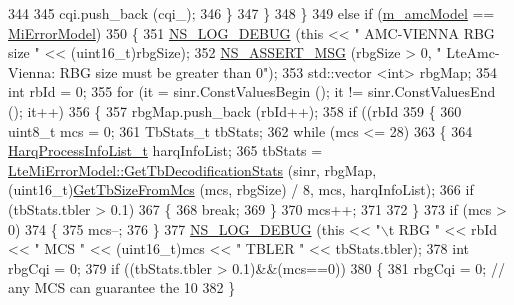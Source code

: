 \begin{DoxyCode}
344 
345               cqi.push\_back (cqi\_);
346             \}
347         \}
348     \}
349   \textcolor{keywordflow}{else} \textcolor{keywordflow}{if} (\hyperlink{classns3_1_1LteAmc_aadde02b027dcbeb1274befeccbdbc1da}{m\_amcModel} == \hyperlink{classns3_1_1LteAmc_a2b3b1ed166e80211de82407dea40c157a37312af64915edb35634cf5920702eda}{MiErrorModel})
350     \{
351       \hyperlink{group__logging_ga413f1886406d49f59a6a0a89b77b4d0a}{NS\_LOG\_DEBUG} (\textcolor{keyword}{this} << \textcolor{stringliteral}{" AMC-VIENNA RBG size "} << (uint16\_t)rbgSize);
352       \hyperlink{assert_8h_aff5ece9066c74e681e74999856f08539}{NS\_ASSERT\_MSG} (rbgSize > 0, \textcolor{stringliteral}{" LteAmc-Vienna: RBG size must be greater than 0"});
353       std::vector <int> rbgMap;
354       \textcolor{keywordtype}{int} rbId = 0;
355       \textcolor{keywordflow}{for} (it = sinr.ConstValuesBegin (); it != sinr.ConstValuesEnd (); it++)
356       \{
357         rbgMap.push\_back (rbId++);
358         \textcolor{keywordflow}{if} ((rbId %
359          \{
360             uint8\_t mcs = 0;
361             TbStats\_t tbStats;
362             \textcolor{keywordflow}{while} (mcs <= 28)
363               \{
364                 \hyperlink{namespacens3_a8e9da9f7a4e5c0954a109b0e1dc36e40}{HarqProcessInfoList\_t} harqInfoList;
365                 tbStats = \hyperlink{classns3_1_1LteMiErrorModel_a9b4bb57209595fa7100a13de1618b130}{LteMiErrorModel::GetTbDecodificationStats}
       (sinr, rbgMap, (uint16\_t)\hyperlink{classns3_1_1LteAmc_affe1f434d32dd7aaa565c863b0f893c1}{GetTbSizeFromMcs} (mcs, rbgSize) / 8, mcs, harqInfoList);
366                 \textcolor{keywordflow}{if} (tbStats.tbler > 0.1)
367                   \{
368                     \textcolor{keywordflow}{break};
369                   \}
370                 mcs++;
371                 
372               \}
373             \textcolor{keywordflow}{if} (mcs > 0)
374               \{
375                 mcs--;
376               \}
377             \hyperlink{group__logging_ga413f1886406d49f59a6a0a89b77b4d0a}{NS\_LOG\_DEBUG} (\textcolor{keyword}{this} << \textcolor{stringliteral}{"\(\backslash\)t RBG "} << rbId << \textcolor{stringliteral}{" MCS "} << (uint16\_t)mcs << \textcolor{stringliteral}{" TBLER "} <<
       tbStats.tbler);
378             \textcolor{keywordtype}{int} rbgCqi = 0;
379             \textcolor{keywordflow}{if} ((tbStats.tbler > 0.1)&&(mcs==0))
380               \{
381                 rbgCqi = 0; \textcolor{comment}{// any MCS can guarantee the 10 %
382               \}
}
\end{DoxyCode}
